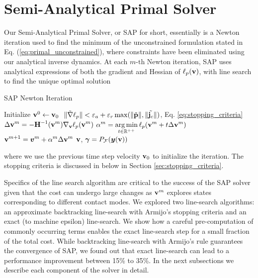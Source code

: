 

\section{Semi-Analytical Primal Solver}
\label{sec:sap_solver}

Our Semi-Analytical Primal Solver, or SAP for short, essentially is a Newton
iteration used to find the minimum of the unconstrained formulation stated in
Eq. (\ref{eq:primal_unconstrained}), where constraints have been eliminated
using our analytical inverse dynamics. At each $m\text{-th}$ Newton iteration,
SAP uses analytical expressions of both the gradient and Hessian of
$\ell_p({\mathbf{v}})$, with line search to find the unique optimal solution
\begin{algorithm}[H]
	\caption{SAP Newton Iteration}	
	\begin{algorithmic}
	\State Initialize ${\mathbf{v}}^0 \gets {\mathbf{v}}_0$
	\RepeatUntil $~\Vert\tilde{\nabla}\ell_p\Vert < \varepsilon_a + \varepsilon_r\max(\Vert\tilde{{\mathbf{p}}}\Vert,\Vert\tilde{{\mathbf{j}}_c}\Vert)$, Eq. \eqref{eq:stopping_criteria}
	\State $\displaystyle \Delta{\mathbf{v}}^{m} = -{\mathbf{H}}^{-1}({\mathbf{v}}^m)\nabla_{\mathbf{v}}\ell_p({\mathbf{v}}^m)\nonumber$
	\State $\displaystyle \alpha^m = \operatorname*{arg\,min}_{t\in\mathbb{R}^{++}} \ell_p({\mathbf{v}}^m + t \Delta{\mathbf{v}}^{m})$
	\State $\displaystyle {\mathbf{v}}^{m+1} = {\bm{v}}^m + \alpha^{m}\Delta{\mathbf{v}}^{m}$
	\EndRepeatUntil
	\State\Return ${\mathbf{v}}$, ${\bm\gamma}=P_\mathcal{F}({\bm{y}}({\mathbf{v}}))$
\end{algorithmic}
\end{algorithm}
where we use the previous time step velocity ${\mathbf{v}}_0$ to initialize the
iteration. The stopping criteria is discussed in below in Section
\ref{sec:stopping_criteria}.

Specifics of the line search algorithm are critical to the success of the SAP
solver given that the cost can undergo large changes as ${\mathbf{v}}^m$ explores
states corresponding to different contact modes. We explored two line-search
algorithms: an approximate backtracking line-search with Armijo's stopping
criteria and an exact (to machine epsilon) line-search. We show how a careful
pre-computation of commonly occurring terms enables the exact line-search step
for a small fraction of the total cost. While backtracking line-search with
Armijo's rule guarantees the convergence of SAP, we found out that exact
line-search can lead to a performance improvement between 15\% to 35\%. In the
next subsections we describe each component of the solver in detail.

